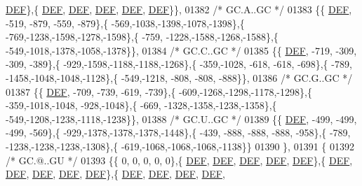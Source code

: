 \begin{DoxyCode}
      \mbox{\hyperlink{1_88_84__epars_8h_a397419fc12b37ed479c8abb9d444d843}{DEF}}\},\{  \mbox{\hyperlink{1_88_84__epars_8h_a397419fc12b37ed479c8abb9d444d843}{DEF}},  \mbox{\hyperlink{1_88_84__epars_8h_a397419fc12b37ed479c8abb9d444d843}{DEF}},  \mbox{\hyperlink{1_88_84__epars_8h_a397419fc12b37ed479c8abb9d444d843}{DEF}},  \mbox{\hyperlink{1_88_84__epars_8h_a397419fc12b37ed479c8abb9d444d843}{DEF}},  \mbox{\hyperlink{1_88_84__epars_8h_a397419fc12b37ed479c8abb9d444d843}{DEF}}\}\},
01382 \textcolor{comment}{/* GC.A..GC */}
01383 \{\{  \mbox{\hyperlink{1_88_84__epars_8h_a397419fc12b37ed479c8abb9d444d843}{DEF}}, -519, -879, -559, -879\},\{ -569,-1038,-1398,-1078,-1398\},\{ -769,-1238,-1598,-1278,-1598\},\{ -759,
      -1228,-1588,-1268,-1588\},\{ -549,-1018,-1378,-1058,-1378\}\},
01384 \textcolor{comment}{/* GC.C..GC */}
01385 \{\{  \mbox{\hyperlink{1_88_84__epars_8h_a397419fc12b37ed479c8abb9d444d843}{DEF}}, -719, -309, -309, -389\},\{ -929,-1598,-1188,-1188,-1268\},\{ -359,-1028, -618, -618, -698\},\{ -789,
      -1458,-1048,-1048,-1128\},\{ -549,-1218, -808, -808, -888\}\},
01386 \textcolor{comment}{/* GC.G..GC */}
01387 \{\{  \mbox{\hyperlink{1_88_84__epars_8h_a397419fc12b37ed479c8abb9d444d843}{DEF}}, -709, -739, -619, -739\},\{ -609,-1268,-1298,-1178,-1298\},\{ -359,-1018,-1048, -928,-1048\},\{ -669,
      -1328,-1358,-1238,-1358\},\{ -549,-1208,-1238,-1118,-1238\}\},
01388 \textcolor{comment}{/* GC.U..GC */}
01389 \{\{  \mbox{\hyperlink{1_88_84__epars_8h_a397419fc12b37ed479c8abb9d444d843}{DEF}}, -499, -499, -499, -569\},\{ -929,-1378,-1378,-1378,-1448\},\{ -439, -888, -888, -888, -958\},\{ -789,
      -1238,-1238,-1238,-1308\},\{ -619,-1068,-1068,-1068,-1138\}\}
01390 \},
01391 \{
01392 \textcolor{comment}{/* GC.@..GU */}
01393 \{\{    0,    0,    0,    0,    0\},\{  \mbox{\hyperlink{1_88_84__epars_8h_a397419fc12b37ed479c8abb9d444d843}{DEF}},  \mbox{\hyperlink{1_88_84__epars_8h_a397419fc12b37ed479c8abb9d444d843}{DEF}},  \mbox{\hyperlink{1_88_84__epars_8h_a397419fc12b37ed479c8abb9d444d843}{DEF}},  \mbox{\hyperlink{1_88_84__epars_8h_a397419fc12b37ed479c8abb9d444d843}{DEF}},  \mbox{\hyperlink{1_88_84__epars_8h_a397419fc12b37ed479c8abb9d444d843}{DEF}}\},\{  
      \mbox{\hyperlink{1_88_84__epars_8h_a397419fc12b37ed479c8abb9d444d843}{DEF}},  \mbox{\hyperlink{1_88_84__epars_8h_a397419fc12b37ed479c8abb9d444d843}{DEF}},  \mbox{\hyperlink{1_88_84__epars_8h_a397419fc12b37ed479c8abb9d444d843}{DEF}},  \mbox{\hyperlink{1_88_84__epars_8h_a397419fc12b37ed479c8abb9d444d843}{DEF}},  \mbox{\hyperlink{1_88_84__epars_8h_a397419fc12b37ed479c8abb9d444d843}{DEF}}\},\{  \mbox{\hyperlink{1_88_84__epars_8h_a397419fc12b37ed479c8abb9d444d843}{DEF}},  \mbox{\hyperlink{1_88_84__epars_8h_a397419fc12b37ed479c8abb9d444d843}{DEF}},  \mbox{\hyperlink{1_88_84__epars_8h_a397419fc12b37ed479c8abb9d444d843}{DEF}},  \mbox{\hyperlink{1_88_84__epars_8h_a397419fc12b37ed479c8abb9d444d843}{DEF}},  

\end{DoxyCode}
